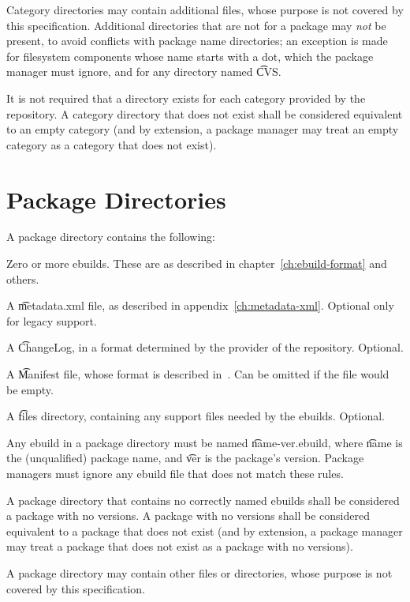Category directories may contain additional files, whose purpose is not covered by this
specification. Additional directories that are not for a package may \emph{not} be present, to avoid
conflicts with package name directories; an exception is made for filesystem components whose name
starts with a dot, which the package manager must ignore, and for any directory named \t{CVS}.

It is not required that a directory exists for each category provided by the repository. A category
directory that does not exist shall be considered equivalent to an empty category (and by extension,
a package manager may treat an empty category as a category that does not exist).

\section{Package Directories}
\label{sec:package-dirs}

A package directory contains the following:
\nobreakpar
\begin{compactitem}
\item Zero or more ebuilds. These are as described in chapter~\ref{ch:ebuild-format} and others.
\item A \t{metadata.xml} file, as described in appendix~\ref{ch:metadata-xml}\@. Optional only for
    legacy support.
\item A \t{ChangeLog}, in a format determined by the provider of the repository. Optional.
\item A \t{Manifest} file, whose format is described in~\cite{Glep74}. Can be omitted if the file
    would be empty.
\item A \t{files} directory, containing any support files needed by the ebuilds. Optional.
\end{compactitem}

Any ebuild in a package directory must be named \t{name-ver.ebuild}, where \t{name} is the
(unqualified) package name, and \t{ver} is the package's version. Package managers must ignore
any ebuild file that does not match these rules.

A package directory that contains no correctly named ebuilds shall be considered a package with no
versions. A package with no versions shall be considered equivalent to a package that does not
exist (and by extension, a package manager may treat a package that does not exist as a package
with no versions).

A package directory may contain other files or directories, whose purpose is not covered by
this specification.


